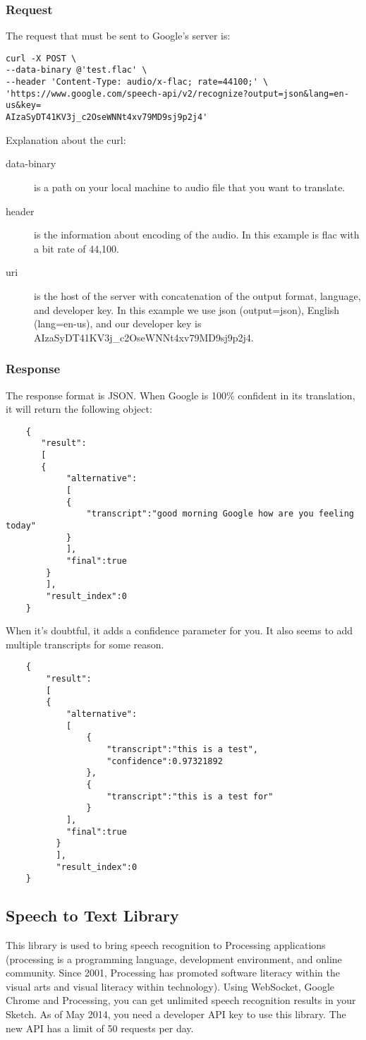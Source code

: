 \subsubsection{Request}
The request that must be sent to Google's server is:
\begin{lstlisting}
curl -X POST \
--data-binary @'test.flac' \
--header 'Content-Type: audio/x-flac; rate=44100;' \
'https://www.google.com/speech-api/v2/recognize?output=json&lang=en-us&key=
AIzaSyDT41KV3j_c2OseWNNt4xv79MD9sj9p2j4'
\end{lstlisting}
Explanation about the curl:
\begin{description}
	\item [data-binary] is a path on your local machine to audio file that you want to translate.
	\item [header] is the information about encoding of the audio. In this example is flac with a bit rate of 44,100.
	\item [uri] is the host of the server with concatenation of the output format, language, and developer key. In this example we use json (output=json), English (lang=en-us), and our developer key is AIzaSyDT41KV3j\_c2OseWNNt4xv79MD9sj9p2j4.
\end{description}
\subsubsection{Response}
The response format is JSON. When Google is 100\% confident in its translation, it will return the following object:
\begin{lstlisting}
	{
	   "result":
	   [
	   {
	   		"alternative":
	   		[
	   		{
	   			"transcript":"good morning Google how are you feeling today"
	   		}
	   		],
	   		"final":true
	   	}
	   	],
	   	"result_index":0
	}
\end{lstlisting}
When it's doubtful, it adds a confidence parameter for you. It also seems to add multiple transcripts for some reason.
\begin{lstlisting}
	{
		"result":
		[
		{
			"alternative":
			[
				{
					"transcript":"this is a test",
					"confidence":0.97321892
		        },
		        {
		        	"transcript":"this is a test for"
		        }
	      	],
	      	"final":true
	      }
	      ],
	      "result_index":0
	}
\end{lstlisting}
\subsection{Speech to Text Library}
This library is used to bring speech recognition to Processing applications (processing is a programming language, development environment, and online community. Since 2001, Processing has promoted software literacy within the visual arts and visual literacy within technology). Using WebSocket, Google Chrome and Processing, you can get unlimited speech recognition results in your Sketch. As of May 2014, you need a developer API key to use this library. The new API has a limit of 50 requests per day.

